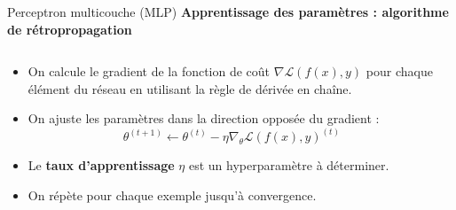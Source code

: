 \documentclass[french]{beamer}
\begin{document}
\begin{frame}{Perceptron multicouche (MLP)}
\textbf{Apprentissage des paramètres : algorithme de rétropropagation\cite{rumelhart1985learning}}
\begin{columns}[T]
\begin{column}{.52\textwidth}
{\small
\begin{itemize}
	\item On calcule le gradient de la fonction de coût $\nabla \mathcal{L}(f(x), y)$ pour chaque élément du réseau en utilisant la règle de dérivée en chaîne.
	\item On ajuste les paramètres dans la direction opposée du gradient : \\ $$ \theta^{(t+1)} \leftarrow \theta^{(t)} - \eta \nabla_{\theta}\mathcal{L}(f(x), y)^{(t)} $$
	\item Le \textbf{taux d'apprentissage} $\eta$ est un hyperparamètre à déterminer.
	\item On répète pour chaque exemple jusqu'à convergence.
\end{itemize}
}
\end{column}
\hfill
\begin{column}{.52\textwidth}

\end{column}
\end{columns}
\end{frame}
\end{document}
